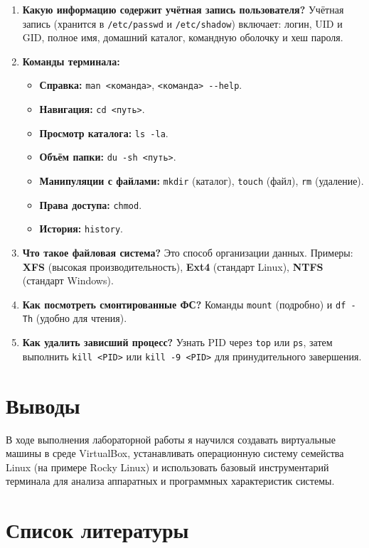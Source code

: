 \documentclass[
  english,
  russian,
  12pt,
  a4paper,
  DIV=11,
  numbers=noendperiod]{scrreprt}
\providecommand{\tightlist}{%
  \setlength{\itemsep}{0pt}\setlength{\parskip}{0pt}}
\begin{document}
\begin{enumerate}
\def\labelenumi{\arabic{enumi}.}
\item
  \textbf{Какую информацию содержит учётная запись пользователя?}
  Учётная запись (хранится в \texttt{/etc/passwd} и
  \texttt{/etc/shadow}) включает: логин, UID и GID, полное имя, домашний
  каталог, командную оболочку и хеш пароля.
\item
  \textbf{Команды терминала:}

  \begin{itemize}
  \tightlist
  \item
    \textbf{Справка:} \texttt{man\ \textless{}команда\textgreater{}},
    \texttt{\textless{}команда\textgreater{}\ -\/-help}.
  \item
    \textbf{Навигация:} \texttt{cd\ \textless{}путь\textgreater{}}.
  \item
    \textbf{Просмотр каталога:} \texttt{ls\ -la}.
  \item
    \textbf{Объём папки:}
    \texttt{du\ -sh\ \textless{}путь\textgreater{}}.
  \item
    \textbf{Манипуляции с файлами:} \texttt{mkdir} (каталог),
    \texttt{touch} (файл), \texttt{rm} (удаление).
  \item
    \textbf{Права доступа:} \texttt{chmod}.
  \item
    \textbf{История:} \texttt{history}.
  \end{itemize}
\item
  \textbf{Что такое файловая система?} Это способ организации данных.
  Примеры: \textbf{XFS} (высокая производительность), \textbf{Ext4}
  (стандарт Linux), \textbf{NTFS} (стандарт Windows).
\item
  \textbf{Как посмотреть смонтированные ФС?} Команды \texttt{mount}
  (подробно) и \texttt{df\ -Th} (удобно для чтения).
\item
  \textbf{Как удалить зависший процесс?} Узнать PID через \texttt{top}
  или \texttt{ps}, затем выполнить
  \texttt{kill\ \textless{}PID\textgreater{}} или
  \texttt{kill\ -9\ \textless{}PID\textgreater{}} для принудительного
  завершения.
\end{enumerate}

\chapter{Выводы}\label{ux432ux44bux432ux43eux434ux44b}

В ходе выполнения лабораторной работы я научился создавать виртуальные
машины в среде VirtualBox, устанавливать операционную систему семейства
Linux (на примере Rocky Linux) и использовать базовый инструментарий
терминала для анализа аппаратных и программных характеристик системы.

\chapter*{Список
литературы}\label{ux441ux43fux438ux441ux43eux43a-ux43bux438ux442ux435ux440ux430ux442ux443ux440ux44b}

\printbibliography[heading=none]
\end{document}
